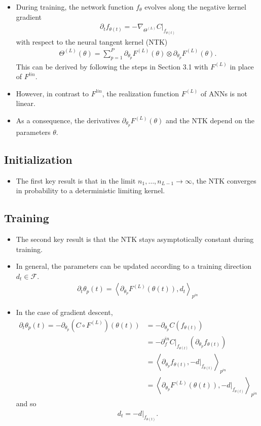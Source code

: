 \documentclass[10pt]{article}
\newcommand{\FF}{\mathcal{F}}
\newcommand{\inner}[2]{\left\langle #1, #2 \right\rangle}
\newcommand{\paran}[1]{{( #1 )}}
\newcommand{\pin}{{p^{in}}}
\newcommand{\din}{\partial^{in}}
\begin{document}
\begin{itemize}
\item During training, the network function $f_\theta$ evolves along the negative kernel gradient
\begin{align*}
\partial_t f_{\theta(t)} = -\nabla_{\Theta^\paran{L}} C|_{f_{\theta(t)}}
\end{align*}
with respect to the neural tangent kernel (NTK)
\begin{align*}
\Theta^\paran{L}(\theta) = \sum_{p = 1}^P \partial_{\theta_p} F^\paran{L}(\theta) \otimes \partial_{\theta_p} F^\paran{L}(\theta).
\end{align*}
This can be derived by following the steps in Section 3.1 with $F^\paran{L}$ in place of $F^{lin}$.
\item However, in contrast to $F^{lin}$, the realization function $F^\paran{L}$ of ANNs is not linear.
\item As a consequence, the derivatives $\partial_{\theta_p} F^\paran{L}(\theta)$ and the NTK depend on the parameters $\theta$.
\end{itemize}

\subsection{Initialization}

\begin{itemize}
\item The first key result is that in the limit $n_1, \ldots, n_{L - 1} \rightarrow \infty$, the NTK converges in probability to a deterministic limiting kernel.
\end{itemize}

\subsection{Training}

\begin{itemize}
\item The second key result is that the NTK stays asymptotically constant during training.
\item In general, the parameters can be updated according to a training direction $d_t \in \FF$.
\begin{align*}
\partial_t \theta_p(t) = \inner{\partial_{\theta_p} F^\paran{L}(\theta(t))}{d_t}_\pin
\end{align*}
\item In the case of gradient descent,
\begin{align*}
\partial_t \theta_p(t) = -\partial_{\theta_p}(C \circ F^\paran{L})(\theta(t)) &= -\partial_{\theta_p} C(f_{\theta(t)}) \\
&= -\din_f C|_{f_{\theta(t)}}(\partial_{\theta_p} f_{\theta(t)}) \\
&=  \inner{\partial_{\theta_p} f_{\theta(t)}}{-d|_{f_{\theta(t)}}}_\pin \\
&= \inner{\partial_{\theta_p} F^\paran{L}(\theta(t))}{-d|_{f_{\theta(t)}}}_\pin
\end{align*}
and so
\begin{align*}
d_t = -d|_{f_{\theta(t)}}.
\end{align*}
\end{itemize}
\end{document}
